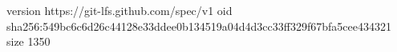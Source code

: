 version https://git-lfs.github.com/spec/v1
oid sha256:549bc6c6d26c44128e33ddee0b134519a04d4d3cc33ff329f67bfa5cee434321
size 1350
